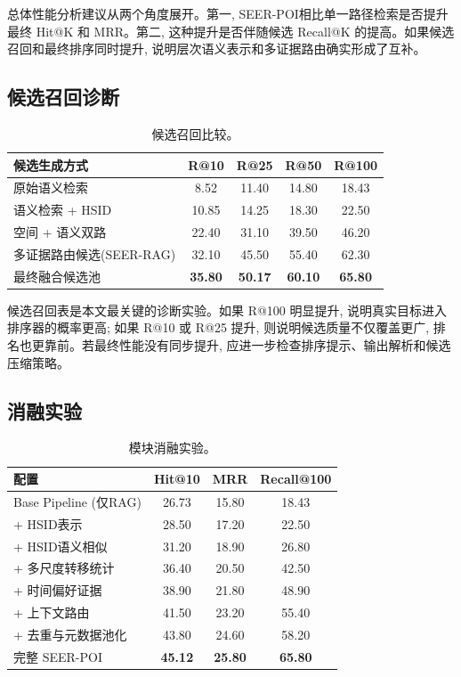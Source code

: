 \documentclass[10pt,twocolumn,fontset=none]{ctexart}
\newcommand{\method}{SEER-POI}
\newcommand{\hsid}{HSID}
\begin{document}
总体性能分析建议从两个角度展开。第一, \method 相比单一路径检索是否提升最终 Hit@K 和 MRR。第二, 这种提升是否伴随候选 Recall@K 的提高。如果候选召回和最终排序同时提升, 说明层次语义表示和多证据路由确实形成了互补。

\subsection{候选召回诊断}
\begin{table}[t]
\centering
\caption{候选召回比较。}
\label{tab:recall}
\small
\begin{tabular}{lcccc}
\toprule
候选生成方式 & R@10 & R@25 & R@50 & R@100 \\
\midrule
原始语义检索 & 8.52 & 11.40 & 14.80 & 18.43 \\
语义检索 + \hsid & 10.85 & 14.25 & 18.30 & 22.50 \\
空间 + 语义双路 & 22.40 & 31.10 & 39.50 & 46.20 \\
多证据路由候选(SEER-RAG) & 32.10 & 45.50 & 55.40 & 62.30 \\
最终融合候选池 & \textbf{35.80} & \textbf{50.17} & \textbf{60.10} & \textbf{65.80} \\
\bottomrule
\end{tabular}
\end{table}

候选召回表是本文最关键的诊断实验。如果 R@100 明显提升, 说明真实目标进入排序器的概率更高; 如果 R@10 或 R@25 提升, 则说明候选质量不仅覆盖更广, 排名也更靠前。若最终性能没有同步提升, 应进一步检查排序提示、输出解析和候选压缩策略。

\subsection{消融实验}
\begin{table}[t]
\centering
\caption{模块消融实验。}
\label{tab:ablation}
\small
\begin{tabular}{lccc}
\toprule
配置 & Hit@10 & MRR & Recall@100 \\
\midrule
Base Pipeline (仅RAG) & 26.73 & 15.80 & 18.43 \\
+ \hsid 表示 & 28.50 & 17.20 & 22.50 \\
+ \hsid 语义相似 & 31.20 & 18.90 & 26.80 \\
+ 多尺度转移统计 & 36.40 & 20.50 & 42.50 \\
+ 时间偏好证据 & 38.90 & 21.80 & 48.90 \\
+ 上下文路由 & 41.50 & 23.20 & 55.40 \\
+ 去重与元数据池化 & 43.80 & 24.60 & 58.20 \\
完整 \method & \textbf{45.12} & \textbf{25.80} & \textbf{65.80} \\
\bottomrule
\end{tabular}
\end{table}
\end{document}

